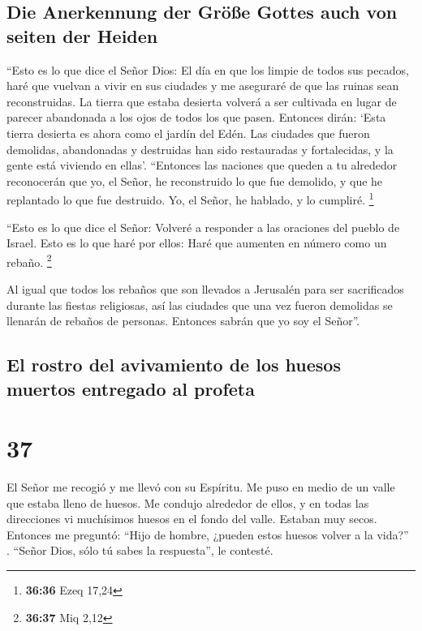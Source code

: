 \hypertarget{die-anerkennung-der-gruxf6uxdfe-gottes-auch-von-seiten-der-heiden}{%
\subsection{Die Anerkennung der Größe Gottes auch von seiten der
Heiden}\label{die-anerkennung-der-gruxf6uxdfe-gottes-auch-von-seiten-der-heiden}}

 ``Esto es lo que dice el Señor Dios: El día en que los
limpie de todos sus pecados, haré que vuelvan a vivir en sus ciudades y
me aseguraré de que las ruinas sean reconstruidas.  La
tierra que estaba desierta volverá a ser cultivada en lugar de parecer
abandonada a los ojos de todos los que pasen.  Entonces
dirán: `Esta tierra desierta es ahora como el jardín del Edén. Las
ciudades que fueron demolidas, abandonadas y destruidas han sido
restauradas y fortalecidas, y la gente está viviendo en ellas'.
 ``Entonces las naciones que queden a tu alrededor
reconocerán que yo, el Señor, he reconstruido lo que fue demolido, y que
he replantado lo que fue destruido. Yo, el Señor, he hablado, y lo
cumpliré. \footnote{\textbf{36:36} Ezeq 17,24}

 ``Esto es lo que dice el Señor: Volveré a responder a
las oraciones del pueblo de Israel. Esto es lo que haré por ellos: Haré
que aumenten en número como un rebaño. \footnote{\textbf{36:37} Miq 2,12}

 Al igual que todos los rebaños que son llevados a
Jerusalén para ser sacrificados durante las fiestas religiosas, así las
ciudades que una vez fueron demolidas se llenarán de rebaños de
personas. Entonces sabrán que yo soy el Señor''.

\hypertarget{el-rostro-del-avivamiento-de-los-huesos-muertos-entregado-al-profeta}{%
\subsection{El rostro del avivamiento de los huesos muertos entregado al
profeta}\label{el-rostro-del-avivamiento-de-los-huesos-muertos-entregado-al-profeta}}

\hypertarget{section-36}{%
\section{37}\label{section-36}}

 El Señor me recogió y me llevó con su Espíritu. Me puso
en medio de un valle que estaba lleno de huesos.  Me
condujo alrededor de ellos, y en todas las direcciones vi muchísimos
huesos en el fondo del valle. Estaban muy secos.  Entonces
me preguntó: ``Hijo de hombre, ¿pueden estos huesos volver a la vida?''
. ``Señor Dios, sólo tú sabes la respuesta'', le contesté.

